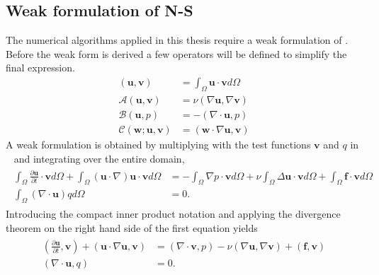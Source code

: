 \subsection{Weak formulation of N-S}
The numerical algorithms applied in this thesis require a weak formulation of .
Before the weak form is derived a few operators will be defined to simplify the final 
expression.
%
\begin{align}
    ( \mathbf{u},\mathbf{v}) &= \int_{\Omega}\mathbf{u} \cdot \mathbf{v} d\Omega\\
    \mathcal{A}(\mathbf{u},\mathbf{v}) &= \nu(\nabla \mathbf{u},\nabla \mathbf{v})\\
    \mathcal{B}(\mathbf{u},p) &= -(\nabla \cdot \mathbf{u},p)\\
    \mathcal{C}(\mathbf{w};\mathbf{u},\mathbf{v}) &= (\mathbf{w}\cdot \nabla \mathbf{u},\mathbf{v})
    \label{eq:weakoperators}
\end{align}
%
A weak formulation is obtained by multiplying with the test functions $\mathbf{v}$ and $q$ in ~ and integrating over
the entire domain,
\begin{align}
    \begin{split}
        \int_{\Omega}\frac{\partial \mathbf{u}}{\partial t}\cdot\mathbf{v}d\Omega
        + \int_{\Omega}(\mathbf{u}\cdot \nabla)\mathbf{u}\cdot\mathbf{v}d\Omega
        &= -\int_{\Omega}\nabla p\cdot \mathbf{v} d\Omega 
        + \nu \int_{\Omega}\Delta\mathbf{u}\cdot\mathbf{v}d\Omega
        + \int_{\Omega}\mathbf{f}\cdot \mathbf{v}d\Omega \\
		\int_{\Omega}(\nabla \cdot \mathbf{u}) qd\Omega &= 0.
    \end{split}
	\label{eq:NSweak1}
\end{align}
Introducing the compact inner product notation and applying the divergence theorem on the right hand side of 
the first equation yields
\begin{align}
    \begin{split}
        (\frac{\partial \mathbf{u}}{\partial t},\mathbf{v})
        + (\mathbf{u}\cdot \nabla\mathbf{u},\mathbf{v})
        &= (\nabla \cdot \mathbf{v} , p ) 
        -\nu(\nabla \mathbf{u},\nabla \mathbf{v})
        + (\mathbf{f},\mathbf{v}) \\
		(\nabla \cdot \mathbf{u},q) &= 0.
    \end{split}
	\label{eq:NSweak}
\end{align}
